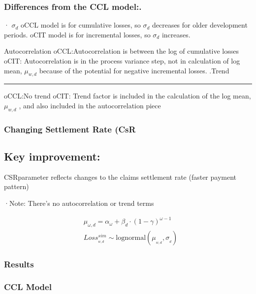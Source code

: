 \documentclass[
]{article}
\begin{document}
\subsubsection{Differences from the CCL
model:.}\label{differences-from-the-ccl-model.}

· \(\sigma_{d}\) oCCL model is for cumulative losses, so \(\sigma_{d}\)
decreases for older development periods. oCIT model is for incremental
losses, so \(\sigma_{d}\) increases.

Autocorrelation oCCL:Autocorrelation is between the log of cumulative
losses oCIT: Autocorrelation is in the process variance step, not in
calculation of log mean, \(\mu_{w,d}\) because of the potential for
negative incremental losses. .Trend

\begin{center}\rule{0.5\linewidth}{0.5pt}\end{center}

oCCL:No trend oCIT: Trend factor is included in the calculation of the
log mean, \(\mu_{w,d}\) , and also included in the autocorrelation piece

\subsubsection{Changing Settlement Rate
(CsR}\label{changing-settlement-rate-csr}

\subsection{Key improvement:}\label{key-improvement-1}

CSRparameter reflects changes to the claims settlement rate (faster
payment pattern)

·Note: There's no autocorrelation or trend terms

\[
\begin{aligned}
&\mu_{\omega,d}=\alpha_{\omega}+\beta_{d}\cdot\left(1-\gamma\right)^{\omega-1} \\
&Loss_{_{w,d}}^{sim}\sim\mathrm{lognormal}(\mu_{_{w,d}},\sigma_{_d})
\end{aligned}
\]

\subsubsection{Results}\label{results}

\subsubsection{CCL Model}\label{ccl-model-1}
\end{document}
